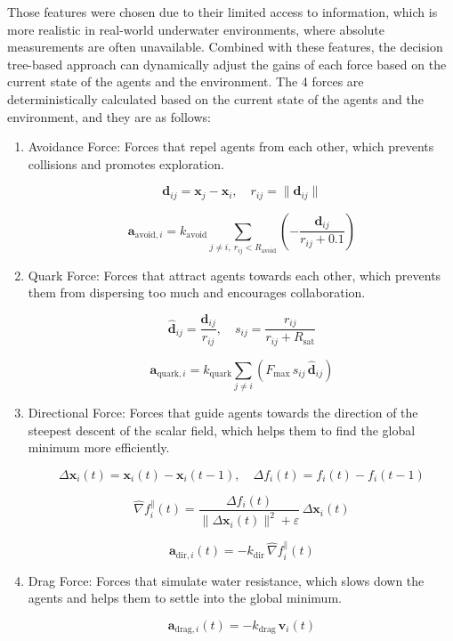 \documentclass[11pt]{article}
\begin{document}
Those features were chosen due to their limited access to information, which is more realistic in real-world underwater environments, where absolute measurements are often unavailable.
Combined with these features, the decision tree-based approach can dynamically adjust the gains of each force based on the current state of the agents and the environment.
The 4 forces are deterministically calculated based on the current state of the agents and the environment, and they are as follows:
\begin{enumerate}
    \item Avoidance Force: Forces that repel agents from each other, which prevents collisions and promotes exploration.

    $$
\mathbf{d}_{ij}=\mathbf{x}_j-\mathbf{x}_i,\quad r_{ij}=\lVert \mathbf{d}_{ij}\rVert
$$

$$
\mathbf{a}_{\mathrm{avoid},i}
=
 k_{\mathrm{avoid}}
\sum_{j\neq i,\ r_{ij}<R_{\mathrm{avoid}}}
\left(
-\frac{\mathbf{d}_{ij}}{r_{ij}+0.1}
\right)
$$

    \item Quark Force: Forces that attract agents towards each other, which prevents them from dispersing too much and encourages collaboration.

    $$
\hat{\mathbf{d}}_{ij}=\frac{\mathbf{d}_{ij}}{r_{ij}},\quad
s_{ij}=\frac{r_{ij}}{r_{ij}+R_{\mathrm{sat}}}
$$

$$
\mathbf{a}_{\mathrm{quark},i}
=
 k_{\mathrm{quark}}
\sum_{j\neq i}
\left(
F_{\max}\,s_{ij}\,\hat{\mathbf{d}}_{ij}
\right)
$$

    \item Directional Force: Forces that guide agents towards the direction of the steepest descent of the scalar field, which helps them to find the global minimum more efficiently.

    $$
\Delta \mathbf{x}_i(t)=\mathbf{x}_i(t)-\mathbf{x}_i(t-1),\quad
\Delta f_i(t)=f_i(t)-f_i(t-1)
$$

$$
\hat{\nabla} f_i^{\parallel}(t)
=
\frac{\Delta f_i(t)}{\lVert \Delta \mathbf{x}_i(t)\rVert^2+\varepsilon}
\,\Delta \mathbf{x}_i(t)
$$

$$
\mathbf{a}_{\mathrm{dir},i}(t)
=
-k_{\mathrm{dir}}\,\hat{\nabla} f_i^{\parallel}(t)
$$

    \item Drag Force: Forces that simulate water resistance, which slows down the agents and helps them to settle into the global minimum.

    $$\mathbf{a}_{\mathrm{drag},i}(t)
=
-k_{\mathrm{drag}}\,\mathbf{v}_i(t)
$$
\end{enumerate}
\end{document}
